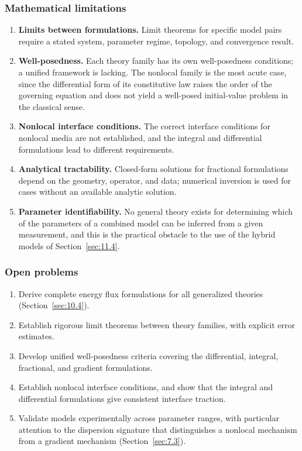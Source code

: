\subsubsection{Mathematical limitations}

\begin{enumerate}
\item \textbf{Limits between formulations.} Limit theorems for specific model pairs require a stated system, parameter regime, topology, and convergence result.
\item \textbf{Well-posedness.} Each theory family has its own well-posedness conditions; a unified framework is lacking. The nonlocal family is the most acute case, since the differential form of its constitutive law raises the order of the governing equation and does not yield a well-posed initial-value problem in the classical sense.
\item \textbf{Nonlocal interface conditions.} The correct interface conditions for nonlocal media are not established, and the integral and differential formulations lead to different requirements.
\item \textbf{Analytical tractability.} Closed-form solutions for fractional formulations depend on the geometry, operator, and data; numerical inversion is used for cases without an available analytic solution.
\item \textbf{Parameter identifiability.} No general theory exists for determining which of the parameters of a combined model can be inferred from a given measurement, and this is the practical obstacle to the use of the hybrid models of Section~\ref{sec:11.4}.
\end{enumerate}

\subsubsection{Open problems}

\begin{enumerate}
\item Derive complete energy flux formulations for all generalized theories (Section~\ref{sec:10.4}).
\item Establish rigorous limit theorems between theory families, with explicit error estimates.
\item Develop unified well-posedness criteria covering the differential, integral, fractional, and gradient formulations.
\item Establish nonlocal interface conditions, and show that the integral and differential formulations give consistent interface traction.
\item Validate models experimentally across parameter ranges, with particular attention to the dispersion signature that distinguishes a nonlocal mechanism from a gradient mechanism (Section~\ref{sec:7.3}).
\end{enumerate}

